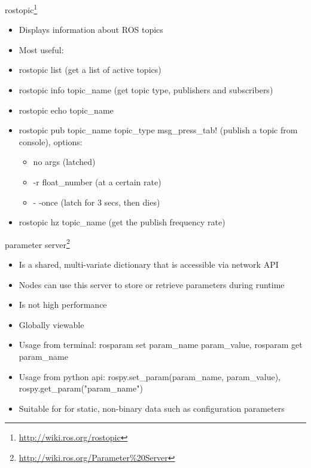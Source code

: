 \documentclass{beamer}
\begin{document}


\begin{frame}{rostopic\footnote{\url{http://wiki.ros.org/rostopic}}}

	\begin{itemize}
		\item Displays information about ROS topics
		\item Most useful:
		\item rostopic list (get a list of active topics)
		\item rostopic info topic\_name (get topic type, publishers and subscribers)
		\item rostopic echo topic\_name
		\item rostopic pub topic\_name topic\_type msg\_press\_tab! (publish a topic from console), options:
		\begin{itemize}
			\item no args (latched)
			\item -r float\_number (at a certain rate)
			\item - -once (latch for 3 secs, then dies)
		\end{itemize}
		\item rostopic hz topic\_name (get the publish frequency rate)
	\end{itemize}

\end{frame}


\begin{frame}{parameter server\footnote{\url{http://wiki.ros.org/Parameter\%20Server}}}
	\begin{itemize}
		\item Is a shared, multi-variate dictionary that is accessible via network API
		\item Nodes can use this server to store or retrieve parameters during runtime
		\item Is not high performance
		\item Globally viewable
		\item Usage from terminal: rosparam set param\_name param\_value, rosparam get param\_name
		\item Usage from python api: rospy.set\_param(param\_name, param\_value), rospy.get\_param("param\_name")
		\item Suitable for for static, non-binary data such as configuration parameters
	\end{itemize}
	
\end{frame}
\end{document}
